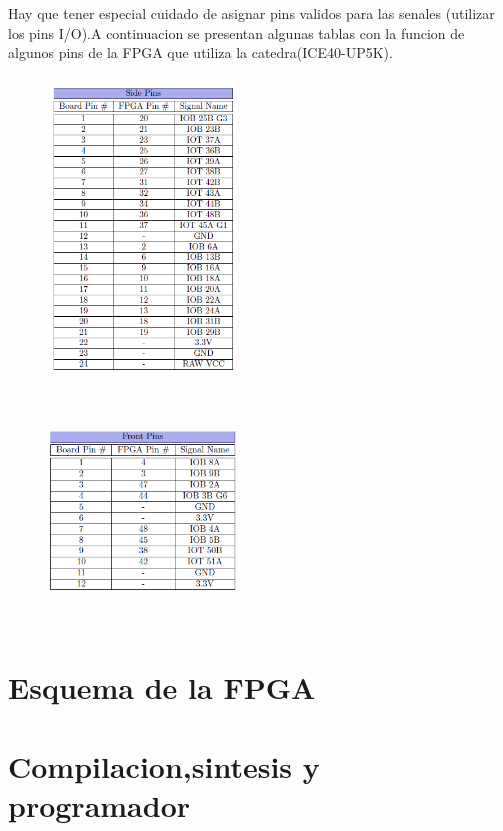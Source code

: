 \documentclass{article}
\begin{document}
 Hay que tener especial cuidado de asignar pins validos para las senales (utilizar los pins I/O).A continuacion se presentan algunas tablas con la funcion de algunos pins de la FPGA que utiliza la catedra(ICE40-UP5K).
 \begin{figure}[H]
 	\centering
	\includegraphics[height=8cm,width=5cm]{Imagenes/SidePins.png}
	\end{figure}
 \begin{figure}[H]
 	\centering
	\includegraphics[height=6cm, width=5cm]{Imagenes/FrontPins.png}
	\end{figure}
\section{Esquema de la FPGA}

\section{Compilacion,sintesis y programador}
\end{document}
